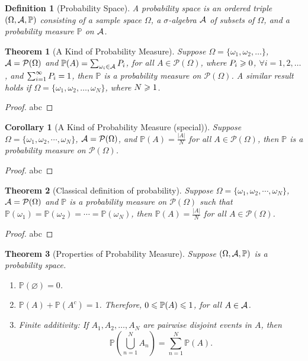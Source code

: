 \documentclass[openany,12pt]{book}
\newtheorem{theorem}{Theorem}[chapter]
\newtheorem{corollary}{Corollary}[chapter]
\newtheorem{definition}{Definition}[chapter]
\begin{document}
\begin{definition}[Probability Space]
  A probability space is an ordered triple $(\Omega,\mathcal{A},\mathbb{P})$ consisting of a sample space $\Omega$, a $\sigma$-algebra $\mathcal{A}$  of subsets of $\Omega$, and a probability measure $\mathbb{P}$ on $\mathcal{A}$.
\end{definition}

\begin{theorem}[A Kind of Probability Measure]
  Suppose $\Omega=\{\omega_1,\omega_2,\dots\}$, $\mathcal{A}=\mathcal{P}(\Omega)$ and $\mathbb{P}(A)=\sum_{\omega_i\in\mathcal{A}}P_i$, for all $A\in\mathcal{P}(\Omega)$, where $P_i\geqslant0$, $\forall i=1,2,\dots$, and $\sum_{i=1}^{\infty} P_i =1$, then $\mathbb{P}$ is a probability measure on $\mathcal{P}(\Omega)$. A similar result holds if $\Omega=\{\omega_1,\omega_2,\dots,\omega_N\}$, where $N\geqslant1$.
\end{theorem}

\begin{proof}
  abc
\end{proof}

\begin{corollary}[A Kind of Probability Measure (special)]
  Suppose $\Omega=\{\omega_1,\omega_2, \cdots,\omega_N\}$, $\mathcal{A}=\mathcal{P}(\Omega)$, and $\mathbb{P}(A)=\frac{|A|}{N}$ for all $A\in\mathcal{P}(\Omega)$, then $\mathbb{P}$ is a probability measure on $\mathcal{P}(\Omega)$.
\end{corollary}

\begin{proof}
  abc
\end{proof}

\begin{theorem}[Classical definition of probability]
  Suppose $\Omega=\{\omega_1,\omega_2, \cdots,\omega_N\}$, $\mathcal{A}=\mathcal{P}(\Omega)$ and $\mathbb{P}$ is a probability measure on $\mathcal{P}(\Omega)$ such that $\mathbb{P}({\omega_1})=\mathbb{P}({\omega_2})=\cdots=\mathbb{P}({\omega_N})$, then $\mathbb{P}(A)=\frac{|A|}{N}$ for all $A\in\mathcal{P}(\Omega)$.
\end{theorem}

\begin{proof}
  abc
\end{proof}

\begin{theorem}[Properties of Probability Measure]
  Suppose $(\Omega,\mathcal{A},\mathbb{P})$ is a probability space.
  \begin{enumerate}
    \item $\mathbb{P}(\varnothing)=0$.
    \item $\mathbb{P}(A)+\mathbb{P}(A^c)=1$. Therefore, $0\leqslant\mathbb{P}(A)\leqslant1$, for all $A\in\mathcal{A}$.
    \item Finite additivity: If $A_1,A_2,\dots,A_N$ are pairwise disjoint events in $A$, then $$\mathbb{P}\left(\bigcup_{n=1}^NA_n \right)=\sum_{n=1}^N\mathbb{P}(A).$$
  \end{enumerate}
\end{theorem}
\end{document}
